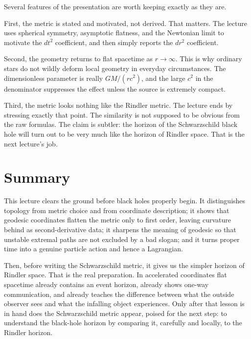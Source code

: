 Several features of the presentation are worth keeping exactly as they are.

First, the metric is stated and motivated, not derived. That matters. The lecture uses spherical symmetry, asymptotic flatness, and the Newtonian limit to motivate the \(dt^2\) coefficient, and then simply reports the \(dr^2\) coefficient.

Second, the geometry returns to flat spacetime as \(r\to\infty\). This is why ordinary stars do not wildly deform local geometry in everyday circumstances. The dimensionless parameter is really \(GM/(rc^2)\), and the large \(c^2\) in the denominator suppresses the effect unless the source is extremely compact.

Third, the metric looks nothing like the Rindler metric. The lecture ends by stressing exactly that point. The similarity is not supposed to be obvious from the raw formulas. The claim is subtler: the horizon of the Schwarzschild black hole will turn out to be very much like the horizon of Rindler space. That is the next lecture's job.

\section{Summary}

This lecture clears the ground before black holes properly begin. It distinguishes topology from metric choice and from coordinate description; it shows that geodesic coordinates flatten the metric only to first order, leaving curvature behind as second-derivative data; it sharpens the meaning of geodesic so that unstable extremal paths are not excluded by a bad slogan; and it turns proper time into a genuine particle action and hence a Lagrangian.

Then, before writing the Schwarzschild metric, it gives us the simpler horizon of Rindler space. That is the real preparation. In accelerated coordinates flat spacetime already contains an event horizon, already shows one-way communication, and already teaches the difference between what the outside observer sees and what the infalling object experiences. Only after that lesson is in hand does the Schwarzschild metric appear, poised for the next step: to understand the black-hole horizon by comparing it, carefully and locally, to the Rindler horizon.